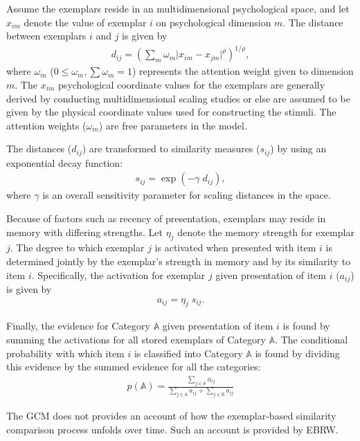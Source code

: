 \documentclass[doc]{apa6}
\begin{document}
Assume the exemplars reside in an multidimensional psychological space, and let $x_{im}$ denote the
value of exemplar $i$ on psychological dimension $m$. The distance between exemplars $i$ and $j$ is
given by
\begin{align}
    d_{ij} = {\left( \sum_{m} \omega_{m} {\vert x_{im} - x_{jm} \vert} ^{\rho} \right)}^{1/\rho},
\end{align}
where $\omega_{m}$ ($0 \leq \omega_{m}, \sum \omega_{m} = 1$) represents the attention weight given
to dimension $m$. The $x_{im}$ psychological coordinate values for the exemplars are generally
derived by conducting multidimensional scaling studies or else are assumed to be given by the
physical coordinate values used for constructing the stimuli.  The attention weights ($\omega_{m}$)
are free parameters in the model.

The distances ($d_{ij}$) are transformed to similarity measures ($s_{ij}$) by using an
exponential decay function:
\begin{align}
    s_{ij} = \exp{(-\gamma \; d_{ij})},
\end{align}
where $\gamma$ is an overall sensitivity parameter for scaling distances in the space.

Because of factors such as recency of presentation, exemplars may reside in memory with differing
strengths. Let $\eta_{j}$ denote the memory strength for exemplar $j$. The degree to which exemplar
$j$ is activated when presented with item $i$ is determined jointly by the exemplar's strength in
memory and by its similarity to item $i$. Specifically, the activation for exemplar $j$ given
presentation of item $i$ ($a_{ij}$) is given by
\begin{align}
    a_{ij} = \eta_{j} \; s_{ij}.
\end{align}

Finally, the evidence for Category $\mathbb{A}$ given presentation of item $i$ is found by summing
the activations for all stored exemplars of Category $\mathbb{A}$. The conditional probability with
which item $i$ is classified into Category $\mathbb{A}$ is found by dividing this evidence by the
summed evidence for all the categories:
\begin{align}
    p(\mathbb{A}) = \frac{\sum_{j \in \mathbb{A}} a_{ij}}
                         {\sum_{j \in \mathbb{A}} a_{ij} + \sum_{j \in \mathbb{B}} a_{ij}}
\end{align}

The GCM does not provides an account of how the exemplar-based similarity comparison process unfolds
over time. Such an account is provided by EBRW\@.
\end{document}
